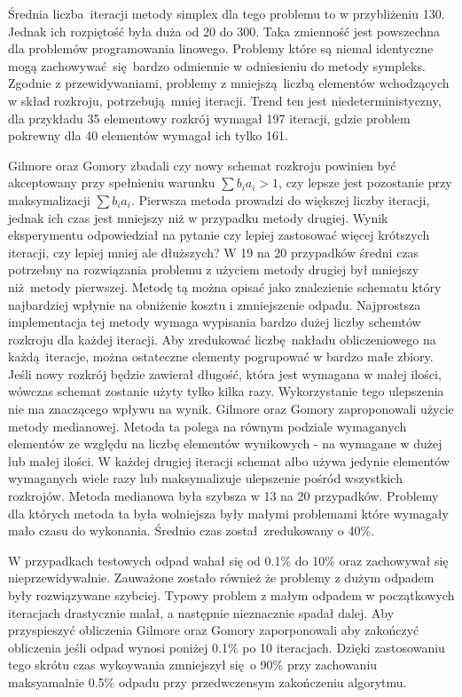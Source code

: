 Średnia liczba iteracji metody simplex dla tego problemu to w przybliżeniu 130. Jednak ich rozpiętość była duża od 20 do 300. Taka zmienność jest powszechna dla problemów programowania linowego. Problemy które są niemal identyczne mogą zachowywać się bardzo odmiennie w odniesieniu do metody sympleks. Zgodnie z przewidywaniami, problemy z mniejszą liczbą elementów wchodzących w skład rozkroju, potrzebują mniej iteracji. Trend ten jest niedeterministyczny, dla przykładu 35 elementowy rozkrój wymagał 197 iteracji, gdzie problem pokrewny dla 40 elementów wymagał ich tylko 161.

Gilmore oraz Gomory zbadali czy nowy schemat rozkroju powinien być akceptowany przy spełnieniu warunku $\sum b_ia_i > 1$, czy lepsze jest pozostanie przy maksymalizacji $\sum b_ia_i$. Pierwsza metoda prowadzi do większej liczby iteracji, jednak ich czas jest mniejszy niż w przypadku metody drugiej. Wynik eksperymentu odpowiedział na pytanie czy lepiej zastosować więcej krótszych iteracji, czy lepiej mniej ale dłuższych? W 19 na 20 przypadków średni czas potrzebny na rozwiązania problemu z użyciem metody drugiej był mniejszy niż metody pierwszej. Metodę tą można opisać jako znalezienie schematu który najbardziej wpłynie na obniżenie kosztu i zmniejszenie odpadu. Najprostsza implementacja tej metody wymaga wypisania bardzo dużej liczby schemtów rozkroju dla każdej iteracji. Aby zredukować liczbę nakładu obliczeniowego na każdą iteracje, można ostateczne elementy pogrupować w bardzo małe zbiory. Jeśli nowy rozkrój będzie zawierał długość, która jest wymagana w małej ilości, wówczas schemat zostanie użyty tylko kilka razy. Wykorzystanie tego ulepszenia nie ma znaczącego wpływu na wynik. Gilmore oraz Gomory zaproponowali użycie metody medianowej. Metoda ta polega na równym podziale wymaganych elementów ze względu na liczbę elementów wynikowych - na wymagane w dużej lub małej ilości. W każdej drugiej iteracji schemat albo używa jedynie elementów wymaganych wiele razy lub maksymalizuje ulepszenie pośród wszystkich rozkrojów. Metoda medianowa była szybsza w 13 na 20 przypadków. Problemy dla których metoda ta była wolniejsza były małymi problemami które wymagały mało czasu do wykonania. Średnio czas został zredukowany o 40\%.

W przypadkach testowych odpad wahał się od 0.1\% do 10\% oraz zachowywał się nieprzewidywalnie. Zauważone zostało również że problemy z dużym odpadem były rozwiązywane szybciej. Typowy problem z małym odpadem w początkowych iteracjach drastycznie malał, a następnie nieznacznie spadał dalej. Aby przyspieszyć obliczenia Gilmore oraz Gomory zaporponowali aby zakończyć obliczenia jeśli odpad wynosi poniżej 0.1\% po 10 iteracjach. Dzięki zastosowaniu tego skrótu czas wykoywania zmniejszył się o 90\% przy zachowaniu maksyamalnie 0.5\% odpadu przy przedwczensym zakończeniu algorytmu.

